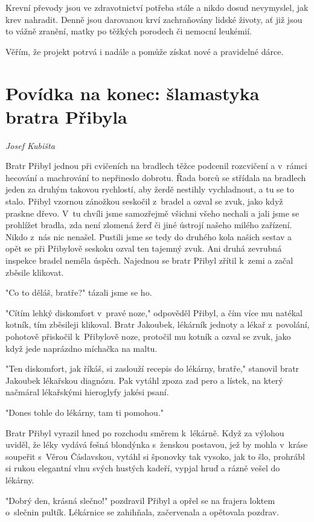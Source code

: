 \documentclass[a5paper, 12pt, twoside]{article}
\begin{document}
Krevní převody jsou ve zdravotnictví potřeba stále a nikdo dosud
nevymyslel, jak krev nahradit. Denně jsou darovanou krví zachraňovány
lidské životy, ať již jsou to vážně zranění, matky po těžkých porodech
či nemocní leukémií.

Věřím, že projekt potrvá i nadále a pomůže získat nové a pravidelné
dárce.

\section{Povídka na konec: šlamastyka bratra
Přibyla}

\textit{Josef Kubišta}

Bratr Přibyl jednou při cvičeních na bradlech těžce podcenil rozcvičení
a v~rámci hecování a machrování to nepřineslo dobrotu. Řada borců se
střídala na bradlech jeden za druhým takovou rychlostí, aby žerdě
nestihly vychladnout, a tu se to stalo. Přibyl vzornou zánožkou seskočil
z~bradel a ozval se zvuk, jako když praskne dřevo. V~tu chvíli jsme
samozřejmě všichni všeho nechali a jali jsme se prohlížet bradla, zda
není zlomená žerď či jiné ústrojí našeho milého zařízení. Nikdo z~nás
nic nenašel. Pustili jsme se tedy do druhého kola našich sestav a opět
se při Přibylově seskoku ozval ten tajemný zvuk. Ani druhá zevrubná
inspekce bradel neměla úspěch. Najednou se bratr Přibyl zřítil k~zemi a
začal zběsile klikovat.

"Co to děláš, bratře?{}" tázali jsme se ho.

"Cítím lehký diskomfort v~pravé noze," odpověděl Přibyl, a čím více mu
natékal kotník, tím zběsileji klikoval. Bratr Jakoubek, lékárník jednoty
a lékař z~povolání, pohotově přiskočil k~Přibylově noze, protočil mu
kotník a ozval se zvuk, jako když jede naprázdno míchačka na maltu.

"Ten diskomfort, jak říkáš, si zaslouží recepis do lékárny, bratře,"
stanovil bratr Jakoubek lékařskou diagnózu. Pak vytáhl zpoza zad pero a
lístek, na který načmáral lékařskými hieroglyfy jakési psaní.

"Dones tohle do lékárny, tam ti pomohou."

Bratr Přibyl vyrazil hned po rozchodu směrem k~lékárně. Když za výlohou
uviděl, že léky vydává fešná blondýnka s~ženskou postavou, jež by mohla
v~kráse soupeřit s~Věrou Čáslavskou, vytáhl si šponovky tak vysoko, jak
to šlo, prohrábl si rukou elegantní vlnu svých hustých kadeří, vypjal
hruď a rázně vešel do lékárny.

"Dobrý den, krásná slečno!{}" pozdravil Přibyl a opřel se na frajera
loktem o~slečnin pultík. Lékárnice se zahihňala, začervenala a opětovala
pozdrav.
\end{document}
